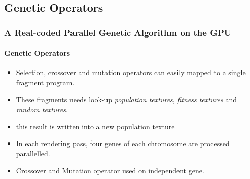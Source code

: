 \subsection{Genetic Operators}
\frame
{
\frametitle{A Real-coded Parallel Genetic Algorithm on the GPU}
\framesubtitle{Genetic Operators}
\begin{itemize}
	\item Selection, crossover and mutation operators can easily mapped to a single fragment program.
	\item These fragments needs look-up \emph{population textures}, \emph{fitness textures} and \emph{random textures}.
	\item this result is written into a new population texture
	\item In each rendering pass, four genes of each chromosome are processed parallelled.
	\item Crossover and Mutation operator used on independent gene.
\end{itemize}
}
